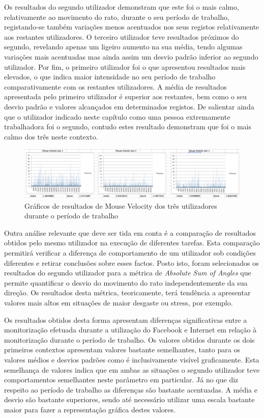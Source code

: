 Os resultados do segundo utilizador demonstram que este foi o mais calmo, relativamente ao movimento do rato, durante o seu período de trabalho, registando-se também variações menos acentuados nos seus registos relativamente aos restantes utilizadores. O terceiro utilizador teve resultados próximos do segundo, revelando apenas um ligeiro aumento na sua média, tendo algumas variações mais acentuadas mas ainda assim um desvio padrão inferior ao segundo utilizador. Por fim, o primeiro utilizador foi o que apresentou resultados mais elevados, o que indica maior intensidade no seu período de trabalho comparativamente com os restantes utilizadores. A média de resultados apresentada pelo primeiro utilizador é superior aos restantes, bem como o seu desvio padrão e valores alcançados em determinados registos. De salientar ainda que o utilizador indicado neste capítulo como uma pessoa extremamente trabalhadora foi o segundo, contudo estes resultado demonstram que foi o mais calmo dos três neste contexto.

 \begin{figure}[htb]
   \centering
   \includegraphics[scale=0.3]{Images/mousevelocity.png}
   \caption{Gráficos de resultados de Mouse Velocity dos três utilizadores durante o período de trabalho}
\end{figure}

Outra análise relevante que deve ser tida em conta é a comparação de resultados obtidos pelo mesmo utilizador na execução de diferentes tarefas. Esta comparação permitirá verificar a diferença de comportamento de um utilizador sob condições diferentes e retirar conclusões sobre esses factos. Posto isto, foram selecionados os resultados do segundo utilizador para a métrica de \textit{Absolute Sum of Angles} que permite quantificar o desvio do movimento do rato independentemente da sua direção. Os resultados desta métrica, teoricamente, terá tendência a apresentar valores mais altos em situações de maior desgaste ou stress, por exemplo.

Os resultados obtidos desta forma apresentam diferenças significativas entre a monitorização efetuada durante a utilização do Facebook e Internet em relação à monitorização durante o período de trabalho. Os valores obtidos durante os dois primeiros contextos apresentam valores bastante semelhantes, tanto para os valores médios e desvios padrões como é inclusivamente visível graficamente. Esta semelhança de valores indica que em ambas as situações o segundo utilizador teve comportamentos semelhantes neste parâmetro em particular. Já no que diz respeito ao período de trabalho as diferenças são bastante acentuadas. A média e desvio são bastante superiores, sendo até necessário utilizar uma escala bastante maior para fazer a representação gráfica destes valores. 

